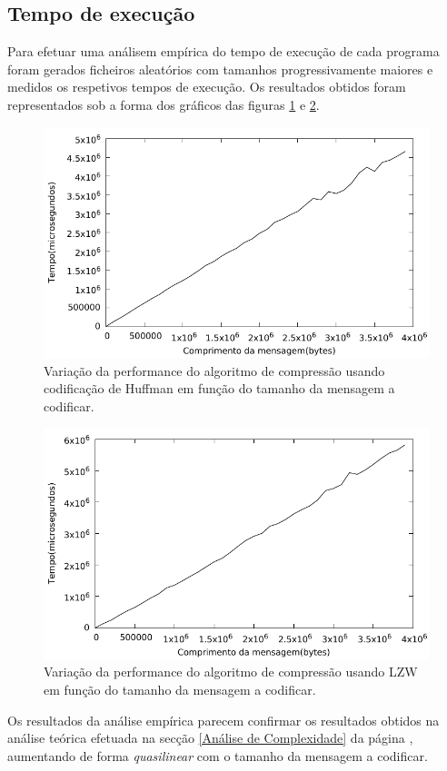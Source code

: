 \documentclass[a4paper,12pt,titlepage]{article}
\begin{document}
\subsection{Tempo de execução}
Para efetuar uma análisem empírica do tempo de execução de cada programa foram gerados ficheiros aleatórios com tamanhos progressivamente maiores e medidos os respetivos tempos de execução. Os resultados obtidos foram representados sob a forma dos gráficos das figuras \ref{f:1} e \ref{f:2}.
\begin{figure}
\includegraphics{huff.pdf}
\caption{Variação da performance do algoritmo de compressão usando codificação de Huffman em função do tamanho da mensagem a codificar.}
\label{f:1}
\end{figure}
\begin{figure}
\includegraphics{lzw.pdf}
\caption{Variação da performance do algoritmo de compressão usando LZW em função do tamanho da mensagem a codificar.}
\label{f:2}
\end{figure}
Os resultados da análise empírica parecem confirmar os resultados obtidos na análise teórica efetuada na secção \ref{Análise de Complexidade} da página \pageref{Análise de Complexidade}, aumentando de forma \emph{quasilinear} com o tamanho da mensagem a codificar.
\end{document}
